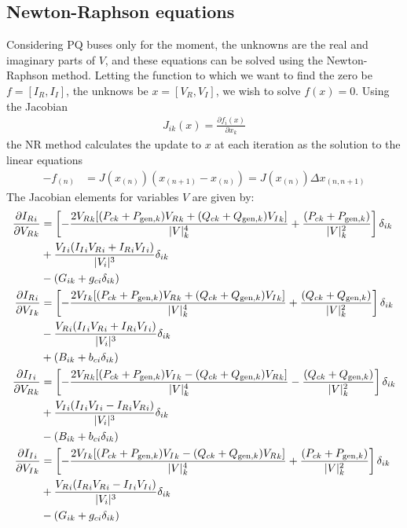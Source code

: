 \documentclass[10pt]{article}
\newcommand{\Vr}{{V_R}}
\newcommand{\Vi}{{V_I}}
\newcommand{\Ir}{{I_R}}
\newcommand{\Ii}{{I_I}}
\begin{document}
\subsection{Newton-Raphson equations}
Considering PQ buses only for the moment, the unknowns are the real and imaginary parts of $V$, and these equations can be solved using the Newton-Raphson method. Letting the function to which we want to find the zero be $f = [\Ir, \Ii]$, the unknows be $x = [\Vr, \Vi]$, we wish to solve $f(x) = 0$. Using the Jacobian
\begin{align}
J_{ik}(x) = \frac{\partial f_i(x)}{\partial x_k}
\end{align}
the NR method calculates the update to $x$ at each iteration as the solution to the linear equations
\begin{align}
-f_{(n)} &= J(x_{(n)})(x_{(n+1)}-x_{(n)}) = J(x_{(n)})\Delta x_{(n,n+1)}
\label{EQ_NR}
\end{align}
The Jacobian elements for variables $V$ are given by:
\begin{align}
	\frac{\partial \Ir_i}{\partial \Vr_{k}} 
		&= \left[-\frac{2\Vr_k[(P_{ck} + P_{\text{gen},k})\Vr_k + (Q_{ck} + Q_{\text{gen},k})\Vi_k]}{|V|_k^4} + \frac{(P_{ck} + P_{\text{gen},k})}{|V|_k^2}\right]\delta_{ik} \notag \\
		&+ \frac{\Vi_i(\Ii_i\Vr_i + \Ir_i\Vi_i)}{|V_i|^3}\delta_{ik} \notag \\
		&- (G_{ik} + g_{ci}\delta_{ik}) \\
	\frac{\partial \Ir_i}{\partial \Vi_{k}} 
		&= \left[-\frac{2\Vi_k[(P_{ck} + P_{\text{gen},k})\Vr_k + (Q_{ck} + Q_{\text{gen},k})\Vi_k]}{|V|_k^4} + \frac{(Q_{ck} + Q_{\text{gen},k})}{|V|_k^2} \right]\delta_{ik} \notag \\
		&- \frac{\Vr_i(\Ii_i\Vr_i + \Ir_i\Vi_i)}{|V_i|^3}\delta_{ik} \notag \\
		&+ (B_{ik} + b_{ci}\delta_{ik}) \\
	\frac{\partial \Ii_i}{\partial \Vr_{k}}
		&= \left[-\frac{2\Vr_k[(P_{ck} + P_{\text{gen},k})\Vi_k - (Q_{ck} + Q_{\text{gen},k})\Vr_k]}{|V|_k^4} - \frac{(Q_{ck} + Q_{\text{gen},k})}{|V|_k^2} \right]\delta_{ik} \notag \\
		&+ \frac{\Vi_i(\Ii_i\Vi_i - \Ir_i\Vr_i)}{|V_i|^3}\delta_{ik} \notag \\
		&- (B_{ik} + b_{ci}\delta_{ik}) \\
	\frac{\partial \Ii_i}{\partial \Vi_{k}}
		&= \left[-\frac{2\Vi_k[(P_{ck} + P_{\text{gen},k})\Vi_k - (Q_{ck} + Q_{\text{gen},k})\Vr_k]}{|V|_k^4} + \frac{(P_{ck} + P_{\text{gen},k})}{|V|_k^2} \right] \delta_{ik} \notag \\
		&+ \frac{\Vr_i(\Ir_i\Vr_i - \Ii_i\Vi_i)}{|V_i|^3}\delta_{ik} \notag \\
		&- (G_{ik} + g_{ci}\delta_{ik})
\end{align}
\end{document}
